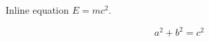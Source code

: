 \documentclass{article}
\begin{document}
Inline equation \(E=mc^2\).

\[
  a^2+b^2=c^2
\]
\end{document}
